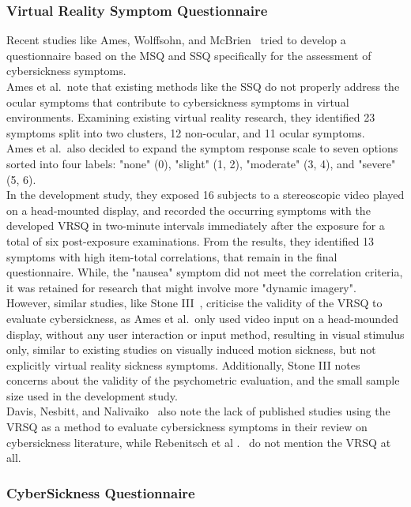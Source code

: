 \subsubsection{Virtual Reality Symptom Questionnaire}\label{subsubsec:virtual-reality-symptom-questionnaire}

Recent studies like Ames, Wolffsohn, and McBrien~\cite{Ames2005} tried to develop a questionnaire based on the MSQ
and SSQ specifically for the assessment of cybersickness symptoms.
\\
Ames et al.\ note that existing methods like the SSQ do not properly address the ocular symptoms that
contribute to cybersickness symptoms in virtual environments.
Examining existing virtual reality research, they identified 23 symptoms split into two clusters, 12 non-ocular, and
11 ocular symptoms.
\\
Ames et al.\ also decided to expand the symptom response scale to seven options sorted into four
labels: "none" (0), "slight" (1, 2), "moderate" (3, 4), and "severe" (5, 6).
\\
In the development study, they exposed 16 subjects to a stereoscopic video played on a
head-mounted display, and recorded the occurring symptoms with the developed VRSQ in two-minute
intervals immediately after the exposure for a total of six post-exposure examinations.
From the results, they identified 13 symptoms with high item-total correlations, that remain in the final
questionnaire.
While, the "nausea" symptom did not meet the correlation criteria, it was retained for research that might involve
more "dynamic imagery".
\\
However, similar studies, like Stone III~\cite{Stone2017}, criticise the validity of the VRSQ to evaluate
cybersickness, as Ames et al.\ only used video input on a head-mounded display, without any user interaction or input
method, resulting in visual stimulus only, similar to existing studies on visually induced motion sickness, but not
explicitly virtual reality sickness symptoms.
Additionally, Stone III notes concerns about the validity of the psychometric evaluation, and the small sample size
used in the development study.
\\
Davis, Nesbitt, and Nalivaiko~\cite{Davis2014} also note the lack of published studies using the VRSQ as a method to
evaluate cybersickness symptoms in their review on cybersickness literature, while Rebenitsch et al
.~\cite{Rebenitsch2016} do not mention the VRSQ at all.

\subsubsection{CyberSickness Questionnaire}\label{subsubsec:cybersickness-questionnaire}

